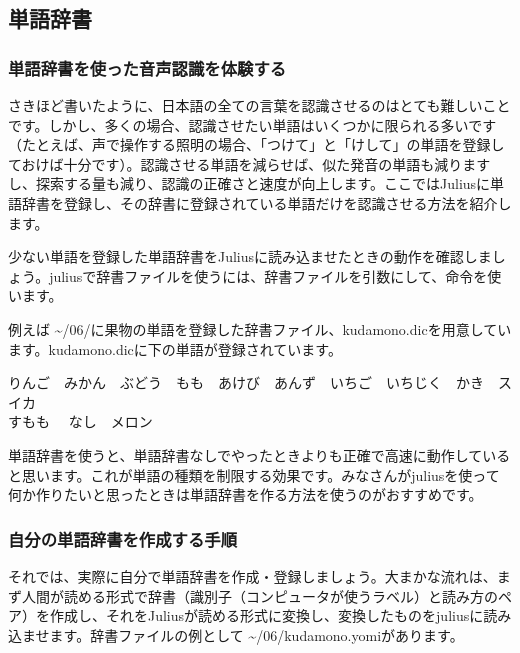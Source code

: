 \subsection{単語辞書}
\subsubsection{単語辞書を使った音声認識を体験する}
さきほど書いたように、日本語の全ての言葉を認識させるのはとても難しいことです。しかし、多くの場合、認識させたい単語はいくつかに限られる多いです（たとえば、声で操作する照明の場合、「つけて」と「けして」の単語を登録しておけば十分です）。認識させる単語を減らせば、似た発音の単語も減りますし、探索する量も減り、認識の正確さと速度が向上します。ここではJuliusに単語辞書を登録し、その辞書に登録されている単語だけを認識させる方法を紹介します。

少ない単語を登録した単語辞書をJuliusに読み込ませたときの動作を確認しましょう。juliusで辞書ファイルを使うには、辞書ファイルを引数にして、命令を使います。\\

例えば \textasciitilde /06/に果物の単語を登録した辞書ファイル、kudamono.dicを用意しています。kudamono.dicに下の単語が登録されています。
\begin{center}
	りんご　みかん　ぶどう　もも　あけび　あんず　いちご　いちじく　かき　スイカ\\すもも　	なし　メロン
\end{center}

単語辞書を使うと、単語辞書なしでやったときよりも正確で高速に動作していると思います。これが単語の種類を制限する効果です。みなさんがjuliusを使って何か作りたいと思ったときは単語辞書を作る方法を使うのがおすすめです。\\

\begin{tcolorbox}[title=\useOmetoi]
\begin{enumerate}
\end{enumerate}
\end{tcolorbox}

\subsubsection{自分の単語辞書を作成する手順}
それでは、実際に自分で単語辞書を作成・登録しましょう。大まかな流れは、まず人間が読める形式で辞書（識別子（コンピュータが使うラベル）と読み方のペア）を作成し、それをJuliusが読める形式に変換し、変換したものをjuliusに読み込ませます。辞書ファイルの例として \textasciitilde /06/kudamono.yomiがあります。\\

